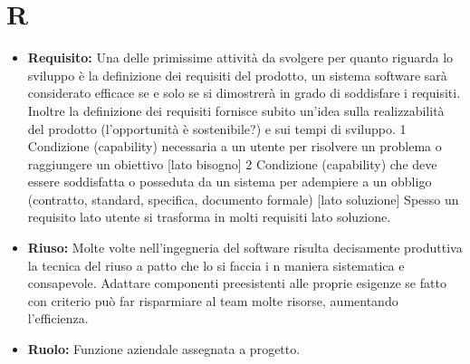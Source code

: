 \documentclass[a4paper]{report}
\newcommand{\mychapter}[2]{
	\setcounter{chapter}{#1}
	\setcounter{section}{0}
	\setcounter{subsection}{1}
	\chapter*{#2}
	\addcontentsline{toc}{chapter}{#2}
}
\begin{document}
	\mychapter{15}{R}
		\begin{itemize}
			\item \textbf{Requisito:}  Una delle primissime attività da svolgere per quanto riguarda lo sviluppo è la 
			definizione dei requisiti del prodotto, un sistema software sarà considerato efficace se e solo se si dimostrerà 
			in grado di soddisfare i requisiti. Inoltre la definizione dei requisiti fornisce subito un’idea sulla realizzabilità 
			del prodotto (l’opportunità è sostenibile?) e sui tempi di sviluppo.
			  1 Condizione (capability) necessaria a un utente per risolvere un problema o raggiungere un obiettivo [lato bisogno]
			  2 Condizione (capability) che deve essere soddisfatta o posseduta da un sistema per adempiere a un obbligo (contratto, 
			  standard, specifica, documento formale) [lato soluzione]
			Spesso un requisito lato utente si trasforma in molti requisiti lato soluzione.
			\item \textbf{Riuso:} Molte volte nell'ingegneria del software risulta decisamente produttiva la tecnica del riuso a patto che lo si faccia i
			n maniera sistematica e consapevole. Adattare componenti preesistenti alle proprie esigenze se fatto con criterio può far 
			risparmiare al team molte risorse, aumentando l’efficienza.
			\item \textbf{Ruolo:} Funzione aziendale assegnata a progetto.
		\end{itemize}
		
\end{document}
